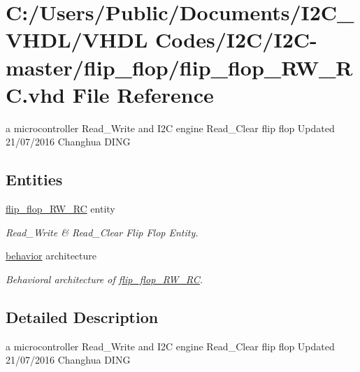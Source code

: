 \hypertarget{flip__flop___r_w___r_c_8vhd}{}\section{C\+:/\+Users/\+Public/\+Documents/\+I2\+C\+\_\+\+V\+H\+D\+L/\+V\+H\+DL Codes/\+I2\+C/\+I2\+C-\/master/flip\+\_\+flop/flip\+\_\+flop\+\_\+\+R\+W\+\_\+\+RC.vhd File Reference}
\label{flip__flop___r_w___r_c_8vhd}


a microcontroller Read\+\_\+\+Write and I2C engine Read\+\_\+\+Clear flip flop Updated 21/07/2016 Changhua D\+I\+NG  


\subsection*{Entities}
\begin{DoxyCompactItemize}
\item 
\hyperlink{classflip__flop___r_w___r_c}{flip\+\_\+flop\+\_\+\+R\+W\+\_\+\+RC} entity
\begin{DoxyCompactList}\small\item\em Read\+\_\+\+Write \& Read\+\_\+\+Clear Flip Flop Entity. \end{DoxyCompactList}\item 
\hyperlink{classflip__flop___r_w___r_c_1_1behavior}{behavior} architecture
\begin{DoxyCompactList}\small\item\em Behavioral architecture of \hyperlink{classflip__flop___r_w___r_c}{flip\+\_\+flop\+\_\+\+R\+W\+\_\+\+RC}. \end{DoxyCompactList}\end{DoxyCompactItemize}


\subsection{Detailed Description}
a microcontroller Read\+\_\+\+Write and I2C engine Read\+\_\+\+Clear flip flop Updated 21/07/2016 Changhua D\+I\+NG 

